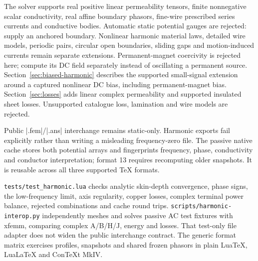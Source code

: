 The solver supports real positive linear permeability tensors, finite
nonnegative scalar conductivity, real affine boundary phasors, fine-wire
prescribed series currents and conductive bodies. Automatic static potential
gauges are rejected: supply an anchored boundary. Nonlinear harmonic material
laws, detailed wire models, periodic pairs, circular open boundaries,
sliding gaps and motion-induced currents
remain separate extensions. Permanent-magnet coercivity is rejected here;
compute its DC field separately instead of oscillating a permanent source.
Section~\ref{sec:biased-harmonic} describes the supported small-signal extension
around a captured nonlinear DC bias, including permanent-magnet bias.
Section~\ref{sec:losses} adds linear complex permeability and supported insulated
sheet losses. Unsupported catalogue loss, lamination and wire models are rejected.

Public |.fem|/|.ans| interchange remains static-only. Harmonic exports fail
explicitly rather than writing a misleading frequency-zero file. The passive
native cache stores both potential arrays and fingerprints frequency, phase,
conductivity and conductor interpretation; format 13 requires recomputing older
snapshots. It is reusable across all three supported TeX formats.

\nolinkurl{tests/test_harmonic.lua} checks analytic skin-depth convergence,
phase signs, the low-frequency limit, axis regularity, copper losses, complex
terminal power balance, rejected combinations and cache round trips.
\nolinkurl{scripts/harmonic-interop.py} independently meshes and solves passive
AC test fixtures with xfemm, comparing complex A/B/H/J, energy and losses.
That test-only file adapter does not widen the public interchange contract.
The generic format matrix exercises profiles, snapshots and shared frozen
phasors in plain LuaTeX, LuaLaTeX and ConTeXt MkIV.
